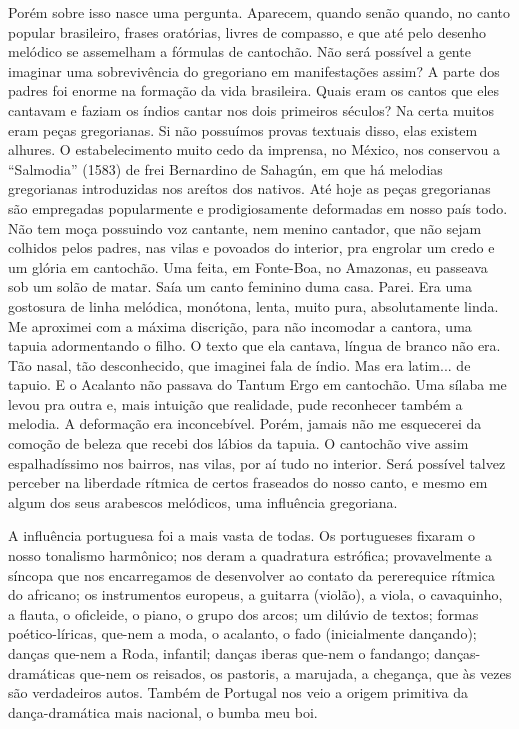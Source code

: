 Porém sobre isso nasce uma pergunta. Aparecem, quando senão quando, no
canto popular brasileiro, frases oratórias, livres de compasso, e que
até pelo desenho melódico se assemelham a fórmulas de cantochão. Não
será possível a gente imaginar uma sobrevivência do gregoriano em
manifestações assim? A parte dos padres foi enorme na formação da vida
brasileira. Quais eram os cantos que eles cantavam e faziam os índios
cantar nos dois primeiros séculos? Na certa muitos eram peças
gregorianas. Si não possuímos provas textuais disso, elas existem
alhures. O estabelecimento muito cedo da imprensa, no México, nos
conservou a ``Salmodia'' (1583) de frei Bernardino de Sahagún, em que há
melodias gregorianas introduzidas nos areítos dos nativos. Até hoje as
peças gregorianas são empregadas popularmente e prodigiosamente
deformadas em nosso país todo. Não tem moça possuindo voz cantante, nem
menino cantador, que não sejam colhidos pelos padres, nas vilas e
povoados do interior, pra engrolar um credo e um glória em cantochão.
Uma feita, em Fonte-Boa, no Amazonas, eu passeava sob um solão de matar.
Saía um canto feminino duma casa. Parei. Era uma gostosura de linha
melódica, monótona, lenta, muito pura, absolutamente linda. Me aproximei
com a máxima discrição, para não incomodar a cantora, uma tapuia
adormentando o filho. O texto que ela cantava, língua de branco não era.
Tão nasal, tão desconhecido, que imaginei fala de índio. Mas era
latim... de tapuio. E o Acalanto não passava do Tantum Ergo em
cantochão. Uma sílaba me levou pra outra e, mais intuição que realidade,
pude reconhecer também a melodia. A deformação era inconcebível. Porém,
jamais não me esquecerei da comoção de beleza que recebi dos lábios da
tapuia. O cantochão vive assim espalhadíssimo nos bairros, nas vilas,
por aí tudo no interior. Será possível talvez perceber na liberdade
rítmica de certos fraseados do nosso canto, e mesmo em algum dos seus
arabescos melódicos, uma influência gregoriana.

A influência portuguesa foi a mais vasta de todas. Os portugueses
fixaram o nosso tonalismo harmônico; nos deram a quadratura estrófica;
provavelmente a síncopa que nos encarregamos de desenvolver ao contato
da pererequice rítmica do africano; os instrumentos europeus, a guitarra
(violão), a viola, o cavaquinho, a flauta, o oficleide, o piano, o grupo
dos arcos; um dilúvio de textos; formas poético-líricas, que-nem a moda,
o acalanto, o fado (inicialmente dançando); danças que-nem a Roda,
infantil; danças iberas que-nem o fandango; danças-dramáticas que-nem os
reisados, os pastoris, a marujada, a chegança, que às vezes são
verdadeiros autos. Também de Portugal nos veio a origem primitiva da
dança-dramática mais nacional, o bumba meu boi.

